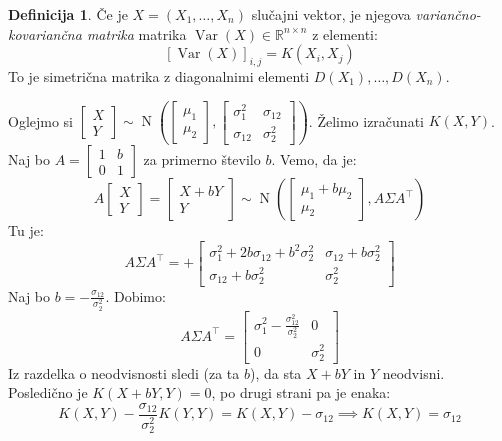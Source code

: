 \documentclass[12pt]{book}
\theoremstyle{definition}
\newtheorem{definicija}{Definicija}
\theoremstyle{plain}
\theoremstyle{plain}
\theoremstyle{plain}
\theoremstyle{plain}
\theoremstyle{remark}
\begin{document}
\begin{definicija}
    Če je $X=\left(X_1, \ldots, X_n\right)$ slučajni vektor, je njegova \emph{variančno-kovariančna matrika} matrika $\operatorname{Var}(X) \in \mathbb{R}^{n \times n}$ z elementi: 
    $$
    [\operatorname{Var}(X)]_{i, j}=K\left(X_i, X_j\right)
    $$
    To je simetrična matrika z diagonalnimi elementi $D\left(X_1\right), \ldots, D\left(X_n\right)$.
\end{definicija}

\begin{zgled}
    Oglejmo si $\begin{bmatrix}X \\ Y\end{bmatrix} \sim \operatorname{N}\left(\begin{bmatrix}\mu_1 \\ \mu_2 \end{bmatrix}, \begin{bmatrix}\sigma_1^2 & \sigma_{12} \\ \sigma_{12} & \sigma_2^2\end{bmatrix} \right)$. Želimo izračunati $K(X,Y)$. Naj bo $A = \begin{bmatrix}1 & b \\ 0 & 1\end{bmatrix}$ za primerno število $b$. Vemo, da je:
    $$A \begin{bmatrix}X \\ Y\end{bmatrix} = \begin{bmatrix}X +bY \\ Y\end{bmatrix} \sim \operatorname{N}\left( \begin{bmatrix}\mu_1 + b \mu_2 \\ \mu_2\end{bmatrix}, A \Sigma A^{\top}\right)$$ 
    Tu je: 
    $$
    A \Sigma A^{\top}=+\begin{bmatrix}
        \sigma_1^2+2 b \sigma_{12}+b^2 \sigma_2^2 & \sigma_{12}+b \sigma_2^2 \\
        \sigma_{12}+b \sigma_2^2 & \sigma_2^2
        \end{bmatrix}
    $$
    Naj bo $b=-\frac{\sigma_{12}}{\sigma_2^2}$. Dobimo: 
    $$
    A \Sigma A^{\top} = \begin{bmatrix}
        \sigma_1^2-\frac{\sigma_{12}^2}{\sigma_2^2} & 0 \\
        0 &  \sigma_2^2
        \end{bmatrix}
    $$
    Iz razdelka o neodvisnosti sledi (za ta $b$), da sta $X+bY$ in $Y$ neodvisni. Posledično je $K(X +bY, Y) = 0$, po drugi strani pa je enaka: 
    $$
    K(X, Y)-\frac{\sigma_{12}}{\sigma_2^2} K(Y, Y)=K(X, Y)-\sigma_{12} \implies K(X,Y) = \sigma_{12}
    $$
\end{zgled}
\end{document}
